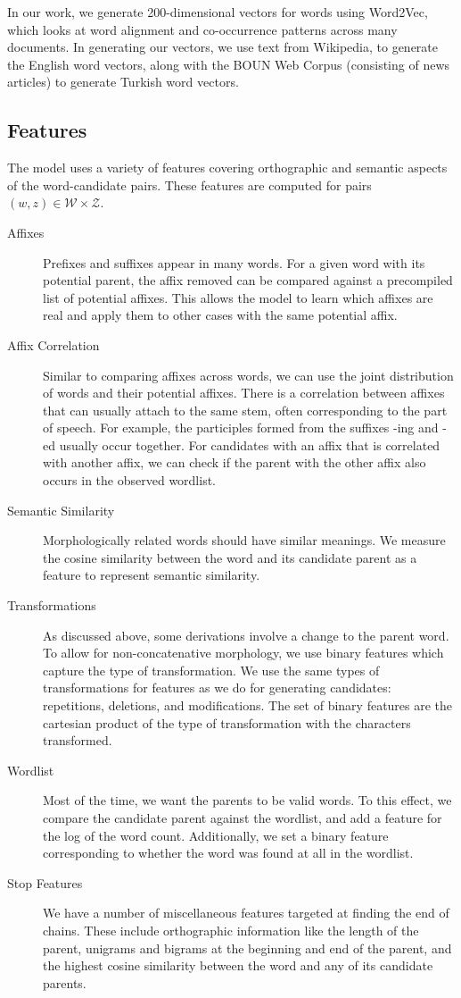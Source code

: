 \documentclass[11pt,twocolumn]{article}
\begin{document}
In our work, we generate 200-dimensional vectors for words using Word2Vec, which looks at word alignment and co-occurrence patterns across many documents. In generating our vectors, we use text from Wikipedia,
to generate the English word vectors, along with the BOUN Web Corpus (consisting of news articles) to generate Turkish word vectors.

\subsection{Features}

The model uses a variety of features covering orthographic and semantic aspects of the word-candidate pairs. These features are computed for pairs $(w,z) \in \mathcal W \times \mathcal Z$.

\begin{description}
    \item[Affixes] Prefixes and suffixes appear in many words. For a given word with its potential parent, the affix removed can be compared against a precompiled list of potential affixes. This allows the model to learn which affixes are real and apply them to other cases with the same potential affix.
    \item[Affix Correlation] Similar to comparing affixes across words, we can use the joint distribution of words and their potential affixes. There is a correlation between affixes that can usually attach to the same stem, often corresponding to the part of speech. For example, the participles formed from the suffixes -ing and -ed usually occur together. For candidates with an affix that is correlated with another affix, we can check if the parent with the other affix also occurs in the observed wordlist.
    \item[Semantic Similarity] Morphologically related words should have similar meanings. We measure the cosine similarity between the word and its candidate parent as a feature to represent semantic similarity.
    \item[Transformations] As discussed above, some derivations involve a change to the parent word. To allow for non-concatenative morphology, we use binary features which capture the type of transformation. We use the same types of transformations for features as we do for generating candidates: repetitions, deletions, and modifications. The set of binary features are the cartesian product of the type of transformation with the characters transformed.
    \item[Wordlist] Most of the time, we want the parents to be valid words. To this effect, we compare the candidate parent against the wordlist, and add a feature for the log of the word count. Additionally, we set a binary feature corresponding to whether the word was found at all in the wordlist.
    \item[Stop Features] We have a number of miscellaneous features targeted at finding the end of chains. These include orthographic information like the length of the parent, unigrams and bigrams at the beginning and end of the parent, and the highest cosine similarity between the word and any of its candidate parents.
\end{description}
\end{document}
